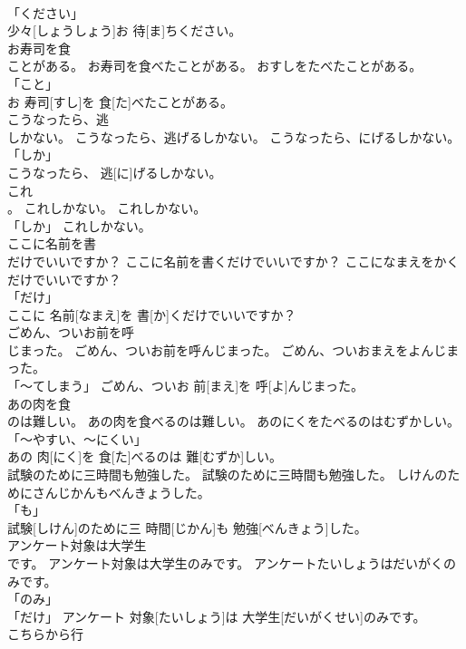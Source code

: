 \documentclass[8pt]{extreport}
\begin{document}
\begin{CJK}{UTF8}{min}
\\	「ください」 
\\	少々[しょうしょう]お 待[ま]ちください。		
\\	お寿司を食
\\	ことがある。	お寿司を食べたことがある。	おすしをたべたことがある。	
\\	「こと」 
\\	お 寿司[すし]を 食[た]べたことがある。		
\\	こうなったら、逃
\\	しかない。	こうなったら、逃げるしかない。	こうなったら、にげるしかない。	
\\	「しか」 
\\	こうなったら、 逃[に]げるしかない。		
\\	これ
\\	。	これしかない。	これしかない。	
\\	「しか」	これしかない。		
\\	ここに名前を書
\\	だけでいいですか？	ここに名前を書くだけでいいですか？	ここになまえをかくだけでいいですか？	
\\	「だけ」 
\\	ここに 名前[なまえ]を 書[か]くだけでいいですか？		
\\	ごめん、ついお前を呼
\\	じまった。	ごめん、ついお前を呼んじまった。	ごめん、ついおまえをよんじまった。	
\\	「～てしまう」	ごめん、ついお 前[まえ]を 呼[よ]んじまった。		
\\	あの肉を食
\\	のは難しい。	あの肉を食べるのは難しい。	あのにくをたべるのはむずかしい。	
\\	「～やすい、～にくい」 
\\	あの 肉[にく]を 食[た]べるのは 難[むずか]しい。		
\\	試験のために三時間も勉強した。	試験のために三時間も勉強した。	しけんのためにさんじかんもべんきょうした。	
\\	「も」 
\\	試験[しけん]のために三 時間[じかん]も 勉強[べんきょう]した。		
\\	アンケート対象は大学生
\\	です。	アンケート対象は大学生のみです。	アンケートたいしょうはだいがくのみです。	
\\	「のみ」 
\\	「だけ」	アンケート 対象[たいしょう]は 大学生[だいがくせい]のみです。		
\\	こちらから行

\end{CJK}
\end{document}
